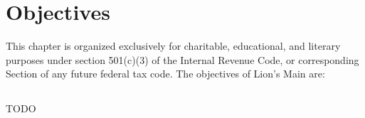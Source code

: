 \chapter{Objectives}\label{sec:objectives}

This chapter is organized exclusively for charitable, educational, and literary purposes under section 501(c)(3) of the Internal Revenue Code, or corresponding Section of any future federal tax code. The objectives of Lion's Main are:

\section{}
TODO
